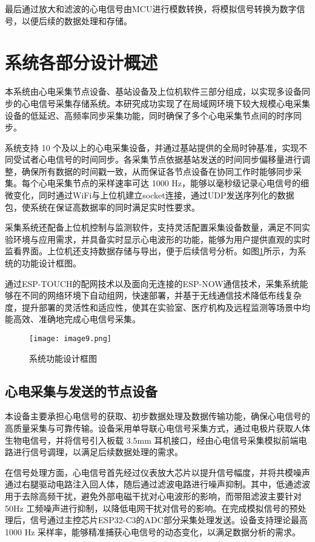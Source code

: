 最后通过放大和滤波的心电信号由MCU进行模数转换，将模拟信号转换为数字信号，以便后续的数据处理和存储。

\newpage    %


\section{系统各部分设计概述}

本系统由心电采集节点设备、基站设备及上位机软件三部分组成，以实现多设备同步的心电信号采集存储系统。本研究成功实现了在局域网环境下较大规模心电采集设备的低延迟、高频率同步采集功能，同时确保了多个心电采集节点间的时序同步。

系统支持 10 个及以上的心电采集设备，并通过基站提供的全局时钟基准，实现不同受试者心电信号的时间同步。各采集节点依据基站发送的时间同步偏移量进行调整，确保所有数据的时间戳一致，从而保证各节点设备在协同工作时能够同步采集。每个心电采集节点的采样速率可达 1000 Hz，能够以毫秒级记录心电信号的细微变化，同时通过WiFi与上位机建立socket连接，通过UDP发送序列化的数据包，使系统在保证高数据率的同时满足实时性要求。

采集系统还配备上位机控制与监测软件，支持灵活配置采集设备数量，满足不同实验环境与应用需求，并具备实时显示心电波形的功能，能够为用户提供直观的实时监看界面。上位机还支持数据存储与导出，便于后续信号分析。如图\ref{F.ECG_image9}所示，为系统的功能设计框图。

通过ESP-TOUCH的配网技术以及面向无连接的ESP-NOW通信技术，采集系统能够在不同的网络环境下自动组网，快速部署，并基于无线通信技术降低布线复杂度，提升部署的灵活性和适应性，使其在实验室、医疗机构及远程监测等场景中均能高效、准确地完成心电信号采集。

\begin{figure}[hbt]
    \centering
    \texttt{[image: image9.png]}
    \caption{系统功能设计框图}
    \label{F.ECG_image9}
\end{figure}

\subsection{心电采集与发送的节点设备}

本设备主要承担心电信号的获取、初步数据处理及数据传输功能，确保心电信号的高质量采集与可靠传输。设备采用单导联心电信号采集方式，通过电极片获取人体生物电信号，并将信号引入板载 3.5mm 耳机接口，经由心电信号采集模拟前端电路进行信号调理，以满足后续数据处理的需求。

在信号处理方面，心电信号首先经过仪表放大芯片以提升信号幅度，并将共模噪声通过右腿驱动电路注入回人体，随后通过滤波电路进行噪声抑制。其中，低通滤波用于去除高频干扰，避免外部电磁干扰对心电波形的影响，而带阻滤波主要针对 50Hz 工频噪声进行抑制，以降低电网干扰对信号的影响。在完成模拟信号的预处理后，信号通过主控芯片ESP32-C3的ADC部分采集处理发送。设备支持理论最高 1000 Hz 采样率，能够精准捕获心电信号的动态变化，以满足数据分析的需求。


